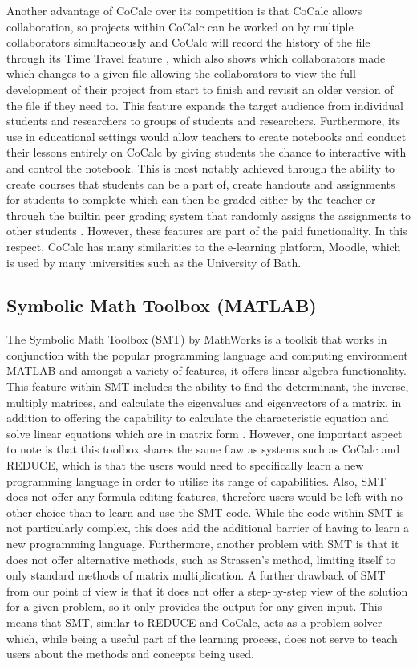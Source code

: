 \documentclass[natbib]{llncs}
\begin{document}
Another advantage of CoCalc over its competition is that CoCalc allows collaboration, so projects within CoCalc can be worked on by multiple collaborators simultaneously \cite{collab} and CoCalc will record the history of the file through its Time Travel feature \cite{timetravel}, which also shows which collaborators made which changes to a given file allowing the collaborators to view the full development of their project from start to finish and revisit an older version of the file if they need to. This feature expands the target audience from individual students and researchers to groups of students and researchers. Furthermore, its use in educational settings would allow teachers to create notebooks and conduct their lessons entirely on CoCalc by giving students the chance to interactive with and control the notebook. This is most notably achieved through the ability to create courses that students can be a part of, create handouts and assignments for students to complete which can then be graded either by the teacher or through the builtin peer grading system that randomly assigns the assignments to other students \cite{sagebook}. However, these features are part of the paid functionality. In this respect, CoCalc has many similarities to the e-learning platform, Moodle, which is used by many universities such as the University of Bath.

\subsection{Symbolic Math Toolbox (MATLAB)}
The Symbolic Math Toolbox (SMT) by MathWorks \cite{smt} is a toolkit that works in conjunction with the popular programming language and computing environment MATLAB \cite{matlabweb} and amongst a variety of features, it offers linear algebra functionality. This feature within SMT includes the ability to find the determinant, the inverse, multiply matrices, and calculate the eigenvalues and eigenvectors of a matrix, in addition to offering the capability to calculate the characteristic equation and solve linear equations which are in matrix form \cite{matlab_linear}. However, one important aspect to note is that this toolbox shares the same flaw as systems such as CoCalc and REDUCE, which is that the users would need to specifically learn a new programming language in order to utilise its range of capabilities. Also, SMT does not offer any formula editing features, therefore users would be left with no other choice than to learn and use the SMT code. While the code within SMT is not particularly complex, this does add the additional barrier of having to learn a new programming language. Furthermore, another problem with SMT is that it does not offer alternative methods, such as Strassen's method, limiting itself to only standard methods of matrix multiplication. A further drawback of SMT from our point of view is that it does not offer a step-by-step view of the solution for a given problem, so it only provides the output for any given input. This means that SMT, similar to REDUCE and CoCalc, acts as a problem solver which, while being a useful part of the learning process, does not serve to teach users about the methods and concepts being used.
\end{document}
